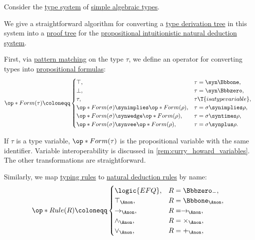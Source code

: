 \begin{algorithm}\label{alg:type_derivation_to_proof_tree}
  Consider the \hyperref[def:abstract_type_system]{type system} of \hyperref[def:simple_algebraic_types]{simple algebraic types}.

  We give a straightforward algorithm for converting a \hyperref[def:type_derivation_tree]{type derivation tree} in this system into a \hyperref[def:propositional_natural_deduction_proof_tree]{proof tree} for the \hyperref[def:propositional_natural_deduction]{propositional intuitionistic natural deduction system}.

  \begin{thmenum}
     First, via \hyperref[con:evaluation]{pattern matching} on the type \( \tau \), we define an operator for converting types into \hyperref[def:propositional_formula]{propositional formulas}:
    \begin{equation*}
      \op*{Form}(\tau) \coloneqq \begin{cases}
        \top,                                            &\tau = \syn\Bbbone, \\
        \bot,                                            &\tau = \syn\Bbbzero, \\
        \tau,                                            &\tau \T{is a type variable}, \\
        \op*{Form}(\sigma) \synimplies \op*{Form}(\rho), &\tau = \sigma \synimplies \rho, \\
        \op*{Form}(\sigma) \synwedge \op*{Form}(\rho),   &\tau = \sigma \syntimes \rho, \\
        \op*{Form}(\sigma) \synvee \op*{Form}(\rho),     &\tau = \sigma \synplus \rho. \\
      \end{cases}
    \end{equation*}

    If \( \tau \) is a type variable, \( \op*{Form}(\tau) \) is the propositional variable with the same identifier. Variable interoperability is discussed in \cref{rem:curry_howard_variables}. The other transformations are straightforward.

     Similarly, we map \hyperref[def:simple_typing_rule]{typing rules} to \hyperref[def:natural_deduction_rule]{natural deduction rules} by name:
    \begin{equation*}
      \op*{Rule}(R) \coloneqq \begin{cases}
        \logic{EFQ},         &R = \Bbbzero_-, \\
        \top_{\Anon},        &R = \Bbbone_{\Anon}, \\
        \rightarrow_{\Anon}, &R = \rightarrow_{\Anon}, \\
        \wedge_{\Anon},      &R = \times_{\Anon}, \\
        \vee_{\Anon},        &R = +_{\Anon}, \\
      \end{cases}
    \end{equation*}


\end{thmenum}
\end{algorithm}
